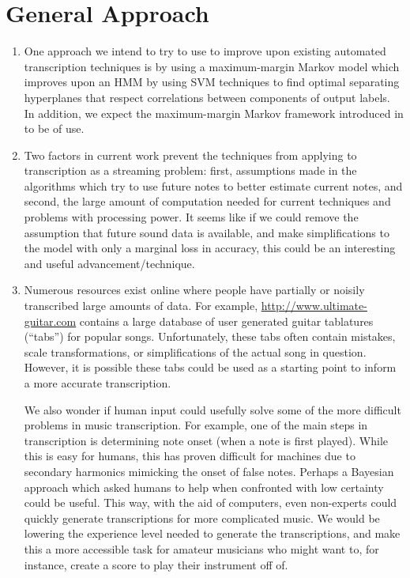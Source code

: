 \documentclass{article}
\begin{document}
\section{General Approach}
\begin{enumerate}
\item
One approach we intend to try to use to improve upon existing automated
transcription techniques is by using a
maximum-margin Markov model \cite{Taskar03max-marginmarkov} which improves
upon an HMM by using SVM techniques to find optimal separating hyperplanes
that respect correlations between components of output labels.
In addition, we expect the maximum-margin Markov framework introduced in
\cite{anguelov2005discriminative} to be of use.
\item
Two factors in current work prevent the techniques from applying to
transcription as a streaming problem: first, assumptions made in the
algorithms which try to use future notes to better estimate current notes,
and second, the large amount of computation needed for
current techniques and problems with processing power. It seems like if we
could remove the assumption that future sound data is available, and make
simplifications to the model with only a marginal loss in accuracy, this
could be an interesting and useful advancement/technique.
\item
Numerous resources exist online where people have partially or noisily
transcribed large amounts of data. For example,
\url{http://www.ultimate-guitar.com}
contains a large database of user generated guitar tablatures (``tabs'') for
popular songs. Unfortunately, these tabs often contain mistakes, scale
transformations, or simplifications of the actual song in
question. However, it is possible these tabs could be used as a starting
point to inform a more accurate transcription.

We also wonder if human input could usefully solve
some of the more difficult problems in music transcription.
For example, one of the main steps in transcription is determining
note onset (when a note is first played). While this is easy for humans,
this has proven difficult for machines due to secondary harmonics mimicking
the onset of false notes. Perhaps a Bayesian approach which asked humans to
help when confronted with low certainty could be useful. This way, with the
aid of computers, even non-experts could quickly generate transcriptions for
more complicated music. We would be lowering the experience level needed to
generate the transcriptions, and make this a more accessible task for amateur
musicians who might want to, for instance, create a score to play their
instrument off of.
\end{enumerate}
\end{document}
